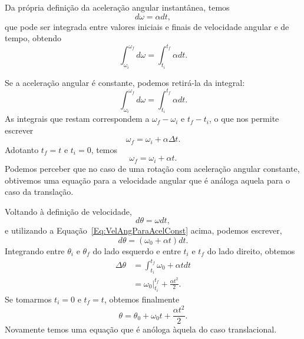 Da própria definição da aceleração angular instantânea, temos
\begin{equation}
	d\omega = \alpha dt,
\end{equation}
%
que pode ser integrada entre valores iniciais e finais de velocidade angular e de tempo, obtendo
\begin{equation}
	\int_{\omega_i}^{\omega_f} d\omega = \int_{t_i}^{t_f} \alpha dt.
\end{equation}

Se a aceleração angular é constante, podemos retirá-la da integral:
\begin{equation}
		\int_{\omega_i}^{\omega_f} d\omega = \int_{t_i}^{t_f} \alpha dt.
\end{equation}
%
As integrais que restam correspondem a $\omega_f - \omega_i$ e $t_f - t_i$, o que nos permite escrever
\begin{equation}
	\omega_f = \omega_i + \alpha\Delta t.
\end{equation}
%
Adotanto $t_f = t$ e $t_i = 0$, temos 
\begin{equation}\label{Eq:VelAngParaAcelConst}
	\omega_f = \omega_i + \alpha t.
\end{equation}
%
Podemos perceber que no caso de uma rotação com aceleração angular constante, obtivemos uma equação para a velocidade angular que é análoga aquela para o caso da translação.

Voltando à definição de velocidade, 
\begin{equation}
	d\theta = \omega dt,
\end{equation}
%
e utilizando a Equação~\ref{Eq:VelAngParaAcelConst} acima, podemos escrever,
\begin{equation}
	d\theta = (\omega_0 + \alpha t) dt.
\end{equation}
%
Integrando entre $\theta_i$ e $\theta_f$ do lado esquerdo e entre $t_i$ e $t_f$ do lado direito, obtemos
\begin{align}
	\Delta \theta &= \int_{t_i}^{t_f} \omega_0 + \alpha t dt \\
	&= \omega_0 |_{t_i}^{t_f} + \frac{\alpha t^2}{2}.
\end{align}
%
Se tomarmos $t_i = 0$ e $t_f = t$, obtemos finalmente
\begin{equation}
	\theta = \theta_0 + \omega_0 t +\frac{\alpha t^2}{2}.
\end{equation}
%
Novamente temos uma equação que é anóloga àquela do caso translacional.
	
